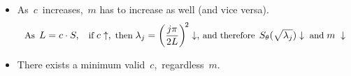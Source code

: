 \documentclass[8pt]{beamer} %
\begin{document}
\begin{frame}[t]
\begin{adjustwidth}{-0.5em}{-2em}
%
\end{adjustwidth}

\centering
\begin{tcolorbox}[colframe=blue!20, colback=white, title={\small Main conclusions}, colbacktitle=lightblue, coltitle=black, boxrule=0.5pt, right=1mm, left=1mm, width=0.99\textwidth]
\begin{itemize}
\item \; As\, $c$\, increases,\, $m$ has to increase as well (and vice versa). 
$$
\small
\text{As}\;\, L=c\cdot S,\hspace{3mm} \text{if}\; c\uparrow,\; \text{then}\; \lambda_j=\left(\frac{j\pi}{2L}\right)^{\!2}\downarrow,\, \text{and therefore}\;\, S_{\theta}(\sqrt{\lambda_j})\downarrow \; \text{and}\; m\; \downarrow
$$ 
\item \; There exists a minimum valid\, $c$,\, regardless\, $m$. %
\end{itemize}
\end{tcolorbox}
\end{frame}
\end{document}
